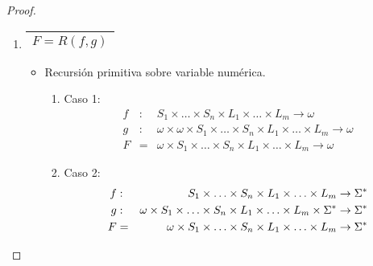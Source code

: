 \begin{proof}
    \begin{enumerate}
      \item \begin{tabular}{|c|} \hline $F = R(f, g)$ \\\hline \end{tabular}
        \begin{itemize}
          \item Recursión primitiva sobre variable numérica.
          \begin{enumerate}
            \item Caso 1:
            \begin{eqnarray*}
              f &:& S_{1} \times \dotsc \times S_{n} \times L_{1} \times \dotsc \times L_{m} \rightarrow \omega \\
              g &:& \omega \times \omega \times S_{1} \times \dotsc \times S_{n} \times L_{1} \times \dotsc \times L_{m}
                \rightarrow \omega \\
              F &=& \omega \times S_{1} \times \dotsc \times S_{n} \times L_{1} \times \dotsc \times L_{m} \rightarrow
                \omega
            \end{eqnarray*}
            \item Caso 2:
            \begin{eqnarray*}
              f &:& S_{1} \times \dotsc \times S_{n} \times L_{1} \times \dotsc \times L_{m} \rightarrow \Sigma^{\ast} \\
              g &:& \omega \times S_{1} \times \dotsc \times S_{n} \times L_{1} \times \dotsc \times L_{m} \times \Sigma^{\ast}
                \rightarrow \Sigma^{\ast} \\
              F &=& \omega \times S_{1} \times \dotsc \times S_{n} \times L_{1} \times \dotsc \times L_{m} \rightarrow
                \Sigma^{\ast}
            \end{eqnarray*}
          \end{enumerate}


\end{itemize}
\end{enumerate}
\end{proof}
